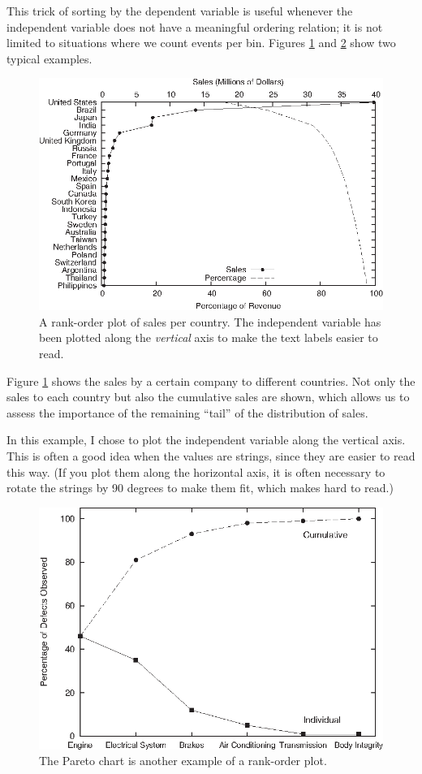 This trick of sorting by the dependent variable is useful whenever the
independent variable does not have a meaningful ordering relation; it
is not limited to situations where we count events per bin. Figures
\ref{fig:sales} and \ref{fig:pareto} show two typical examples.
\begin{figure}
  \centerline{\includegraphics{img/sales}}
  \caption{A rank-order plot of sales per country. The independent
    variable has been plotted along the \emph{vertical} axis to make
    the text labels easier to read.}
  \label{fig:sales}
\end{figure}

Figure \ref{fig:sales} shows the sales by a certain company to
different countries. Not only the sales to each country but also the
cumulative sales are shown, which allows us to assess the importance
of the remaining ``tail'' of the distribution of sales.

In this example, I chose to plot the independent variable along the
vertical axis. This is often a good idea when the values are strings,
since they are easier to read this way. (If you plot them along the
horizontal axis, it is often necessary to rotate the strings by 90
degrees to make them fit, which makes hard to read.)

\begin{figure}
  \centerline{\includegraphics{img/pareto}}
  \caption{The Pareto chart is another example of a rank-order plot.}
  \label{fig:pareto}
\end{figure}


